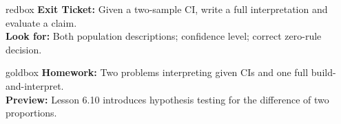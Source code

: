 \documentclass[10pt]{article}
\begin{document}
\begin{skillbox}{redbox}
    \textbf{Exit Ticket:} Given a two-sample CI, write a full interpretation and evaluate a claim.\\[4pt]
    \textbf{Look for:} Both population descriptions; confidence level; correct zero-rule decision.
\end{skillbox}

\begin{skillbox}{goldbox}
    \textbf{Homework:} Two problems interpreting given CIs and one full build-and-interpret.\\[4pt]
    \textbf{Preview:} Lesson 6.10 introduces hypothesis testing for the difference of two proportions.
\end{skillbox}
\end{document}
